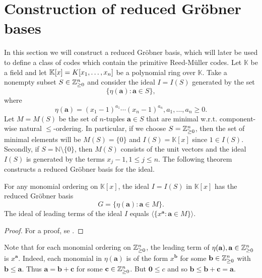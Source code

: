 \documentclass[english,bachelor]{liumaiex}
\begin{document}
\section{Construction of reduced Gröbner bases}
In this section we will construct a reduced Gröbner basis, which will later be used to define a class of codes which contain the primitive Reed-M{\"u}ller codes. Let $\mathbb{K}$ be a field and let $\mathbb{K}[x]=K[x_1,\dots, x_n]$ be a polynomial ring over $\mathbb{K}$. Take a nonempty subset $S\in\mathbb{Z}_{\geq 0}^n$ and consider the ideal $I=I(S)$ generated by the set
\begin{displaymath}
\{\eta(\mathbf{a})\colon\mathbf{a}\in S\},
\end{displaymath}
where
\begin{displaymath}
\eta(\mathbf{a})=(x_1-1)^{a_1}\cdots(x_n-1)^{a_n}, a_1,\dots,a_n \geq0.
\end{displaymath}
Let $M=M(S)$ be the set of $n$-tuples $\mathbf{a}\in S$ that are minimal w.r.t. component-wise natural $\leq$-ordering. In particular, if we choose $S=\mathbb{Z}_{\geq 0}^n$, then the set of minimal elements will be $M(S)=\{0\}$ and $I(S)=\mathbb{K}[x]$ since $1\in I(S)$. Secondly, if $S=\mathbb{N}\setminus\{0\}$, then $M(S)$ consists of the unit vectors and the ideal $I(S)$ is generated by the terms $x_j-1, 1\leq j\leq n$. The following theorem constructs a reduced Gröbner basis for the ideal.

\begin{thm}
\label{thm:redgrobner}
For any monomial ordering on $\mathbb{K}[x]$, the ideal $I=I(S)$ in $\mathbb{K}[x]$ has the reduced Gröbner basis
\begin{displaymath}
G=\{\eta(\mathbf{a})\colon\mathbf{a}\in M\}.
\end{displaymath}
The ideal of leading terms of the ideal $I$ equals $\langle \{x^\mathbf{a} \colon \mathbf{a}\in M\}\rangle.$
\end{thm}
\begin{proof}
For a proof, se \cite[pp. 40-43]{phd}.
\end{proof}
Note that for each monomial ordering on $\mathbb{Z}_{\geq 0}^n$, the leading term of $\eta(\mathbf{a}), \mathbf{a}\in\mathbb{Z}_{\geq 0}^n$ is $x^\mathbf{a}$. Indeed, each monomial in $\eta(\mathbf{a})$ is of the form $x^\mathbf{b}$ for some $\mathbf{b}\in\mathbb{Z}_{\geq 0}^n$ with $\mathbf{b}\leq\mathbf{a}$. Thus $\mathbf{a}=\mathbf{b}+\mathbf{c}$ for some $\mathbf{c}\in\mathbb{Z}_{\geq 0}^n$. But $\mathbf{0}\leq c$ and so $\mathbf{b}\leq \mathbf{b}+\mathbf{c}=\mathbf{a}$.
\end{document}
